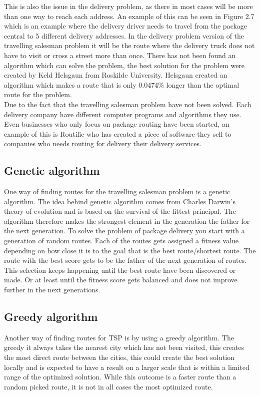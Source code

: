 \documentclass[12pt]{report}
\begin{document}
This is also the issue in the delivery problem, as there in most cases will be more than one way to reach each address. An example of this can be seen in Figure 2.7 which is an example where the delivery driver needs to travel from the package central to 5 different delivery addresses. In the delivery problem version of the travelling salesman problem it will be the route where the delivery truck does not have to visit or cross a street more than once\cite{tsp}. There has not been found an algorithm which can solve the problem, the best solution for the problem were created by Keld Helsgaun from Roskilde University\cite{keld}. Helsgaun created an algorithm which makes a route that is only 0.0474\% longer than the optimal route for the problem\cite{tsp2}.\\

Due to the fact that the travelling salesman problem have not been solved. Each delivery company have different computer programs and algorithms they use. Even businesses who only focus on package routing have been started, an example of this is Routific who has created a piece of software they sell to companies who needs routing for delivery their delivery services\cite{routific}.         


\subsection{Genetic algorithm}
One way of finding routes for the travelling salesman problem is a genetic algorithm. The idea behind genetic algorithm comes from Charles Darwin's theory of evolution and is based on the survival of the fittest principal. The algorithm therefore makes the strongest element in the generation the father for the next generation. To solve the problem of package delivery you start with a generation of random routes. Each of the routes gets assigned a fitness value depending on how close it is to the goal that is the best route/shortest route. The route with the best score gets to be the father of the next generation of routes. This selection keeps happening until the best route have been discovered or made. Or at least until the fitness score gets balanced and does not improve further in the next generations\cite{geneticalg}.

\subsection{Greedy algorithm}
Another way of finding routes for TSP is by using a greedy algorithm. The greedy it always takes the nearest city which has not been visited, this creates the most direct route between the cities, this could create the best solution locally and is expected to have a result on a larger scale that is within a limited range of the optimized solution. While this outcome is a faster route than a random picked route, it is not in all cases the most optimized route\cite{solvingcdp}.
\end{document}
